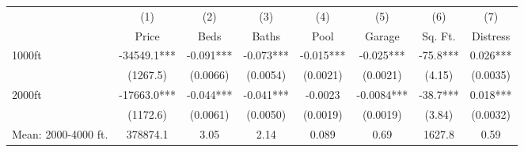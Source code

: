 {
\def\sym#1{\ifmmode^{#1}\else\(^{#1}\)\fi}
\begin{tabular}{l*{7}{c}}
\toprule
                    &\multicolumn{1}{c}{(1)}&\multicolumn{1}{c}{(2)}&\multicolumn{1}{c}{(3)}&\multicolumn{1}{c}{(4)}&\multicolumn{1}{c}{(5)}&\multicolumn{1}{c}{(6)}&\multicolumn{1}{c}{(7)}\\
                    &\multicolumn{1}{c}{Price}&\multicolumn{1}{c}{Beds}&\multicolumn{1}{c}{Baths}&\multicolumn{1}{c}{Pool}&\multicolumn{1}{c}{Garage}&\multicolumn{1}{c}{Sq. Ft.}&\multicolumn{1}{c}{Distress}\\
\midrule
1000ft              &    -34549.1***&      -0.091***&      -0.073***&      -0.015***&      -0.025***&       -75.8***&       0.026***\\
                    &    (1267.5)   &    (0.0066)   &    (0.0054)   &    (0.0021)   &    (0.0021)   &      (4.15)   &    (0.0035)   \\
\addlinespace
2000ft              &    -17663.0***&      -0.044***&      -0.041***&     -0.0023   &     -0.0084***&       -38.7***&       0.018***\\
                    &    (1172.6)   &    (0.0061)   &    (0.0050)   &    (0.0019)   &    (0.0019)   &      (3.84)   &    (0.0032)   \\
\midrule
Mean: 2000-4000 ft. &    378874.1   &        3.05   &        2.14   &       0.089   &        0.69   &      1627.8   &        0.59   \\
\bottomrule
\end{tabular}
}
